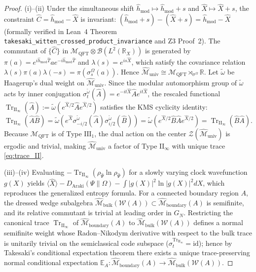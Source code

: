\documentclass[11pt,a4paper]{article}
\theoremstyle{plain}
\theoremstyle{definition}
\theoremstyle{remark}
\newcommand{\TrII}{\operatorname{Tr}_{\mathrm{II}_\infty}}
\newcommand{\M}{\mathcal{M}}
\newcommand{\W}{\mathcal{W}}
\newcommand{\R}{\mathbb{R}}
\newcommand{\Ebb}{\mathbb{E}}
\begin{document}
\begin{proof}
(i)--(ii) Under the simultaneous shift $\hat{h}_{\mathrm{mod}} \mapsto \hat{h}_{\mathrm{mod}} + s$ and $\hat{X} \mapsto \hat{X} + s$, the constraint $\hat{C} = \hat{h}_{\mathrm{mod}} - \hat{X}$ is invariant: $(\hat{h}_{\mathrm{mod}} + s) - (\hat{X} + s) = \hat{h}_{\mathrm{mod}} - \hat{X}$ (formally verified in Lean~4 Theorem \texttt{takesaki\_witten\_crossed\_product\_invariance} and Z3 Proof~2). The commutant of $\{\hat{C}\}$ in $\M_{\mathrm{QFT}} \otimes \mathcal{B}(L^2(\R_X))$ is generated by $\pi(a) = e^{i\hat{h}_{\mathrm{mod}}\hat{T}} a e^{-i\hat{h}_{\mathrm{mod}}\hat{T}}$ and $\lambda(s) = e^{is\hat{X}}$, which satisfy the covariance relation $\lambda(s)\pi(a)\lambda(-s) = \pi(\sigma_s^\Omega(a))$. Hence $\widehat{\M}_{\mathrm{univ}} \cong \M_{\mathrm{QFT}} \rtimes_{\sigma^\Omega} \R$. Let $\tilde{\omega}$ be Haagerup's dual weight on $\widehat{\M}_{\mathrm{univ}}$. Since the modular automorphism group of $\tilde{\omega}$ acts by inner conjugation $\sigma_t^{\tilde{\omega}}(\hat{A}) = e^{-it\hat{X}}\hat{A}e^{it\hat{X}}$, the rescaled functional $\TrII(\hat{A}) := \tilde{\omega}(e^{\hat{X}/2}\hat{A}e^{\hat{X}/2})$ satisfies the KMS cyclicity identity:
\begin{equation}
  \TrII(\hat{A}\hat{B}) = \tilde{\omega}\left( e^{\hat{X}} \sigma_{-i/2}^{\tilde{\omega}}(\hat{A}) \sigma_{i/2}^{\tilde{\omega}}(\hat{B}) \right) = \tilde{\omega}\left( e^{\hat{X}/2} \hat{B}\hat{A} e^{\hat{X}/2} \right) = \TrII(\hat{B}\hat{A}).
\end{equation}
Because $\M_{\mathrm{QFT}}$ is of Type $\mathrm{III}_1$, the dual action on the center $\mathcal{Z}(\widehat{\M}_{\mathrm{univ}})$ is ergodic and trivial, making $\widehat{\M}_{\mathrm{univ}}$ a factor of Type $\mathrm{II}_\infty$ with unique trace \eqref{eq:trace_II}.

(iii)--(iv) Evaluating $-\TrII(\rho_{\widehat{\Psi}}\ln\rho_{\widehat{\Psi}})$ for a slowly varying clock wavefunction $g(X)$ yields $\langle \hat{X} \rangle - D_{\mathrm{Araki}}(\Psi\|\Omega) - \int |g(X)|^2 \ln|g(X)|^2 dX$, which reproduces the generalized entropy formula. For a connected boundary region $A$, the dressed wedge subalgebra $\widehat{\M}_{\mathrm{bulk}}(\W(A)) \subset \widehat{\M}_{\mathrm{boundary}}(A)$ is semifinite, and its relative commutant is trivial at leading order in $G_N$. Restricting the canonical trace $\TrII$ of $\widehat{\M}_{\mathrm{boundary}}(A)$ to $\widehat{\M}_{\mathrm{bulk}}(\W(A))$ defines a normal semifinite weight whose Radon--Nikodym derivative with respect to the bulk trace is unitarily trivial on the semiclassical code subspace ($\sigma_t^{\TrII} = \mathrm{id}$); hence by Takesaki's conditional expectation theorem \cite{Takesaki2003} there exists a unique trace-preserving normal conditional expectation $\Ebb_A: \widehat{\M}_{\mathrm{boundary}}(A) \to \widehat{\M}_{\mathrm{bulk}}(\W(A))$.
\end{proof}
\end{document}
